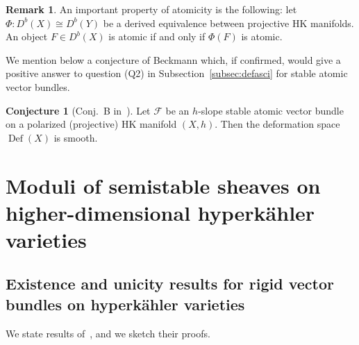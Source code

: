 \documentclass[11pt]{amsart}
\let\mathcal\mathscr
\def\cF{\mathcal{F}}
\DeclareMathOperator{\Def}{Def}
\theoremstyle{definition}
\newtheorem{rmk}[lmm]{Remark}
\newtheorem{cnj}[lmm]{Conjecture}
\theoremstyle{remark}
\begin{document}
%
%
\begin{rmk}\label{rmk:equivderatomico}
%
An important property of atomicity is the following: let $\Phi\colon D^b(X)\cong D^b(Y)$ be a derived equivalence between projective HK manifolds. An object $F\in D^b(X)$ is atomic if and only if $\Phi(F)$ is atomic.
%
\end{rmk}
%
We mention below a conjecture of Beckmann which, if confirmed, would give a positive answer to question (Q2) in 
Subsection~\ref{subsec:defasci} for stable atomic vector bundles.
%
\begin{cnj}[Conj.~B in~\cite{beckmann:atomic}]\label{cnj:atomicoliscio}
%
Let $\cF$ be an $h$-slope stable atomic vector bundle on a polarized (projective) HK manifold $(X,h)$. Then the deformation space $\Def(X)$ is smooth.
%
\end{cnj}
%





%
\section{Moduli of semistable sheaves  on higher-dimensional hyperk\"ahler varieties}\label{sec:alfinteoremi}
%

%
\subsection{Existence and unicity results for rigid vector bundles on  hyperk\"ahler varieties}
%
%
\setcounter{equation}{0}
%
We state  results of~\cite{og:fascimod,og:fascik3n}, and we sketch their proofs. 

%
\end{document}

